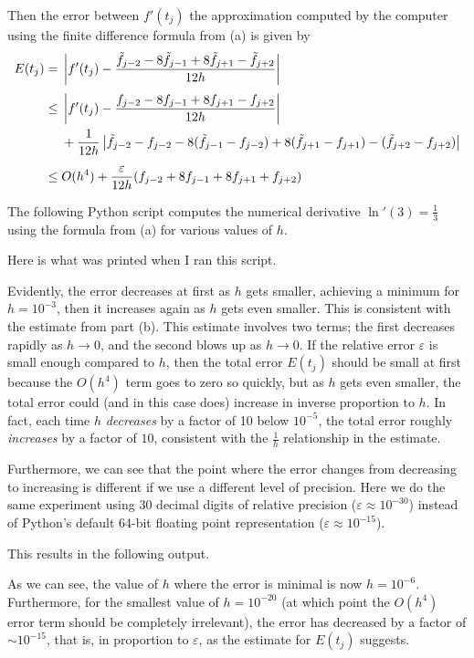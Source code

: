 \documentclass{homework}
\begin{document}
\begin{alphaparts}
	Then the error between $f'(t_j)$ the approximation computed by the computer using the finite difference formula from (a) is given by
	\begin{equation}
	\begin{alignedat}{2}
		E(t_j) &{}={}& &\left|f'(t_j) - \frac{\tilde{f}_{j-2} -8\tilde{f}_{j-1} + 8\tilde{f}_{j+1} - \tilde{f}_{j+2}}{12h}\right| \\[.3em]&{}\le{}& &\left|f'(t_j) - \frac{f_{j-2} - 8f_{j-1} + 8f_{j+1} - f_{j+2}}{12h}\right| \\
		&&&{}+ \frac{1}{12h}\left|\tilde{f}_{j-2} - f_{j-2} - 8(\tilde{f}_{j-1} - f_{j-2}) + 8(\tilde{f}_{j+1} - f_{j+1}) - (\tilde{f}_{j+2} - f_{j+2})\right| \\[0.5em]&{}\le{}& &O(h^4) + \frac{\varepsilon}{12h}(f_{j-2} + 8f_{j-1} + 8f_{j+1} + f_{j+2})
	\end{alignedat}
	\end{equation}
	
	\questionpart The following Python script computes the numerical derivative $\ln'(3) = \frac{1}{3}$ using the formula from (a) for various values of $h$.
	
	Here is what was printed when I ran this script.
	
	Evidently, the error decreases at first as $h$ gets smaller, achieving a minimum for $h = 10^{-3}$, then it increases again as $h$ gets even smaller. This is consistent with the estimate from part (b). This estimate involves two terms; the first decreases rapidly as $h \to 0$, and the second blows up as $h\to 0$. If the relative error $\varepsilon$ is small enough compared to $h$, then the total error $E(t_j)$ should be small at first because the $O(h^4)$ term goes to zero so quickly, but as $h$ gets even smaller, the total error could (and in this case does) increase in inverse proportion to $h$. In fact, each time $h$ \textit{decreases} by a factor of 10 below $10^{-5}$, the total error roughly \textit{increases} by a factor of $10$, consistent with the $\frac{1}{h}$ relationship in the estimate.
	
	Furthermore, we can see that the point where the error changes from decreasing to increasing is different if we use a different level of precision. Here we do the same experiment using 30 decimal digits of relative precision ($\varepsilon \approx 10^{-30}$) instead of Python's default 64-bit floating point representation ($\varepsilon \approx 10^{-15}$).
	
	This results in the following output.
	
	As we can see, the value of $h$ where the error is minimal is now $h = 10^{-6}$. Furthermore, for the smallest value of $h=10^{-20}$ (at which point the $O(h^4)$ error term should be completely irrelevant), the error has decreased by a factor of $\sim 10^{-15}$, that is, in proportion to $\varepsilon$, as the estimate for $E(t_j)$ suggests.
	\end{alphaparts}
	
\end{document}
